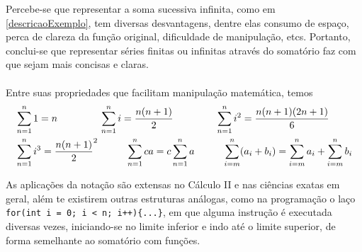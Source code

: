 \documentclass[14pt]{article}
\begin{document}
Percebe-se que representar a soma sucessiva infinita, como em \ref{descricaoExemplo}, tem diversas desvantagens, dentre elas consumo de espaço, perca de clareza da função original, dificuldade de manipulação, etcs. Portanto, conclui-se que representar séries finitas ou infinitas através do somatório faz com que sejam mais concisas e claras. \\\\
Entre suas propriedades que facilitam manipulação matemática, temos
\begin{equation}
\begin{aligned}
 & \sum\limits_{n=1}^{n} 1 = n    
 \hspace{1.5cm}
 \sum\limits_{n=1}^{n} i = \frac{n(n+1)}{2}
 \hspace{1.5cm}
 \sum\limits_{n=1}^{n} i^{2} = \frac{n(n+1)(2n+1)}{6} \\
 & \sum\limits_{n=1}^{n} i^{3} = {\frac{n(n+1)}{2}}^{2}
 \hspace{1cm}
 \sum\limits_{n=1}^{n} ca = c\sum\limits_{n=1}^{n} a
 \hspace{1cm}
 \sum\limits_{i=m}^{n} (a_{i} + b_{i})  =  \sum\limits_{i=m}^{n} a_{i} + \sum\limits_{i=m}^{n} b_{i}
\end{aligned}
\end{equation}

\cite{stewart:2016}



As aplicações da notação são extensas no Cálculo II e nas ciências exatas em geral, além te existirem outras estruturas análogas, como na programação o laço \verb|for(int i = 0; i < n; i++){...}|,
em que alguma instrução é executada diversas vezes, iniciando-se no limite inferior e indo até o limite superior, de forma semelhante ao somatório com funções.



\end{document}
